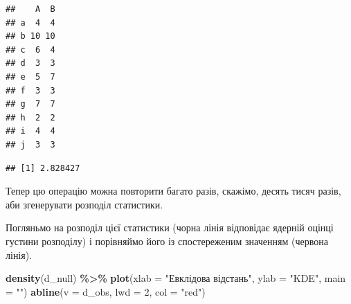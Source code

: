 \documentclass[
  11pt,
]{book}
\newenvironment{Shaded}{\begin{snugshade}}{\end{snugshade}}
\newcommand{\AttributeTok}[1]{\textcolor[rgb]{0.13,0.29,0.53}{#1}}
\newcommand{\ControlFlowTok}[1]{\textcolor[rgb]{0.13,0.29,0.53}{\textbf{#1}}}
\newcommand{\DecValTok}[1]{\textcolor[rgb]{0.00,0.00,0.81}{#1}}
\newcommand{\FunctionTok}[1]{\textcolor[rgb]{0.13,0.29,0.53}{\textbf{#1}}}
\newcommand{\NormalTok}[1]{#1}
\newcommand{\OtherTok}[1]{\textcolor[rgb]{0.56,0.35,0.01}{#1}}
\newcommand{\SpecialCharTok}[1]{\textcolor[rgb]{0.81,0.36,0.00}{\textbf{#1}}}
\newcommand{\StringTok}[1]{\textcolor[rgb]{0.31,0.60,0.02}{#1}}
\begin{document}
\begin{verbatim}
##    A  B
## a  4  4
## b 10 10
## c  6  4
## d  3  3
## e  5  7
## f  3  3
## g  7  7
## h  2  2
## i  4  4
## j  3  3
\end{verbatim}

\begin{Shaded}
\end{Shaded}

\begin{verbatim}
## [1] 2.828427
\end{verbatim}

Тепер цю операцію можна повторити багато разів, скажімо, десять тисяч разів, аби згенерувати розподіл статистики.

\begin{Shaded}
\end{Shaded}

Погляньмо на розподіл цієї статистики (чорна лінія відповідає ядерній оцінці густини розподілу) і порівняймо його із спостереженим значенням (червона лінія).

\begin{Shaded}
\begin{Highlighting}[]
\FunctionTok{density}\NormalTok{(d\_null) }\SpecialCharTok{\%\textgreater{}\%} \FunctionTok{plot}\NormalTok{(}\AttributeTok{xlab =} \StringTok{"Евклідова відстань"}\NormalTok{, }\AttributeTok{ylab =} \StringTok{"KDE"}\NormalTok{, }\AttributeTok{main =} \StringTok{""}\NormalTok{)}
\FunctionTok{abline}\NormalTok{(}\AttributeTok{v =}\NormalTok{ d\_obs, }\AttributeTok{lwd =} \DecValTok{2}\NormalTok{, }\AttributeTok{col =} \StringTok{"red"}\NormalTok{)}
\end{Highlighting}
\end{Shaded}
\end{document}
